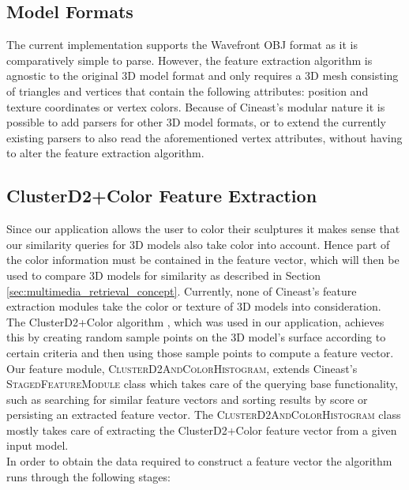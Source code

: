 \subsection{Model Formats}

The current implementation supports the Wavefront OBJ format \cite{wavefront_obj} as it is comparatively
simple to parse. However, the feature extraction algorithm is agnostic to the original 3D model format and only requires
a 3D mesh consisting of triangles and vertices that contain the following attributes: position and texture coordinates or vertex colors.
Because of Cineast's modular nature it is possible to add parsers for other 3D model formats, or
to extend the currently existing parsers to also read the aforementioned vertex attributes, without having to alter
the feature extraction algorithm.

\subsection{ClusterD2+Color Feature Extraction}

Since our application allows the user to color their sculptures it makes sense that our similarity queries for 3D models also
take color into account. Hence part of the color information must be contained in the feature vector, which will then be used
to compare 3D models for similarity as described in Section \ref{sec:multimedia_retrieval_concept}.
Currently, none of Cineast's feature extraction modules take the color or texture of 3D models into consideration.\\
The ClusterD2+Color algorithm \cite{cluster_d2_color}, which was used in our application,
achieves this by creating random sample points on the 3D model's surface according to certain criteria and then
using those sample points to compute a feature vector.\\
Our feature module, \textsc{ClusterD2AndColorHistogram}, extends Cineast's \textsc{StagedFeatureModule} class which takes care of the
querying base functionality, such as searching for similar feature vectors and sorting results by score or persisting an extracted feature vector.
The \textsc{ClusterD2AndColorHistogram} class mostly takes care of extracting the ClusterD2+Color feature vector from a given input model.\\
In order to obtain the data required to construct a feature vector the algorithm runs through the following stages:

